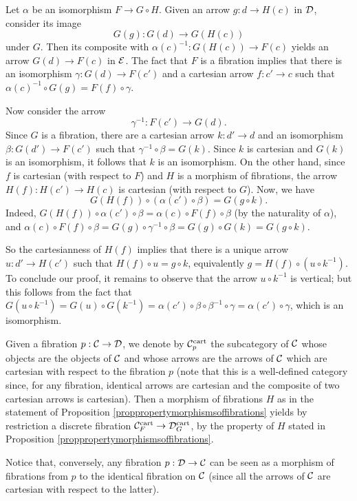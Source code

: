 \documentclass[a4paper,12pt]{article}
\begin{document}
\begin{proofs}
Let $\alpha$ be an isomorphism $F\to G\circ H$. Given an arrow $g:d\to H(c)$ in $\cal D$, consider its image 
\[
G(g):G(d)\to G(H(c))
\] 	
under $G$. Then its composite with $\alpha(c)^{-1}:G(H(c))\to F(c)$ yields an arrow $G(d)\to F(c)$ in $\cal E$. The fact that $F$ is a fibration implies that there is an isomorphism $\gamma:G(d)\to F(c')$ and a cartesian arrow $f:c'\to c$ such that $\alpha(c)^{-1}\circ G(g)=F(f)\circ \gamma$. 

Now consider the arrow 
\[
\gamma^{-1}:F(c')\to G(d).
\]
Since $G$ is a fibration, there are a cartesian arrow $k:d'\to d$ and an isomorphism $\beta:G(d')\to F(c')$ such that $\gamma^{-1}\circ \beta=G(k)$. Since $k$ is cartesian and $G(k)$ is an isomorphism, it follows that $k$ is an isomorphism. On the other hand, since $f$ is cartesian (with respect to $F$) and $H$ is a morphism of fibrations, the arrow $H(f):H(c')\to H(c)$ is cartesian (with respect to $G$). Now, we have 
\[
G(H(f))\circ (\alpha(c')\circ \beta)=G(g\circ k).
\] 
Indeed, $G(H(f))\circ \alpha(c')\circ \beta=\alpha(c)\circ F(f)\circ \beta$ (by the naturality of $\alpha$), and $\alpha(c)\circ F(f)\circ \beta=G(g)\circ \gamma^{-1}\circ \beta=G(g)\circ G(k)=G(g\circ k)$.

So the cartesianness of $H(f)$ implies that there is a unique arrow $u:d'\to H(c')$ such that $H(f)\circ u=g\circ k$, equivalently $g=H(f)\circ (u\circ k^{-1})$. To conclude our proof, it remains to observe that the arrow $u\circ k^{-1}$ is vertical; but this follows from the fact that $G(u\circ k^{-1})=G(u)\circ G(k^{-1})=\alpha(c')\circ \beta  \circ \beta^{-1} \circ \gamma=\alpha(c')\circ \gamma$, which is an isomorphism.  
\end{proofs}


\begin{remark}
	Given a fibration $p:{\cal C}\to {\cal D}$, we denote by ${\cal C}^{\textup{cart}}_{p}$ the subcategory of $\cal C$ whose objects are the objects of $\cal C$ and whose arrows are the arrows of $\cal C$ which are cartesian with respect to the fibration $p$ (note that this is a well-defined category since, for any fibration, identical arrows are cartesian and the composite of two cartesian arrows is cartesian). Then a morphism of fibrations $H$ as in the statement of Proposition \ref{proppropertymorphismsoffibrations} yields by restriction a discrete fibration ${\cal C}^{\textup{cart}}_{F} \to {\cal D}^{\textup{cart}}_{G}$, by the property of $H$ stated in Proposition \ref{proppropertymorphismsoffibrations}.
	
	Notice that, conversely, any fibration $p:{\cal D}\to {\cal C}$ can be seen as a morphism of fibrations from $p$ to the identical fibration on $\cal C$ (since all the arrows of $\cal C$ are cartesian with respect to the latter).
\end{remark}
\end{document}
